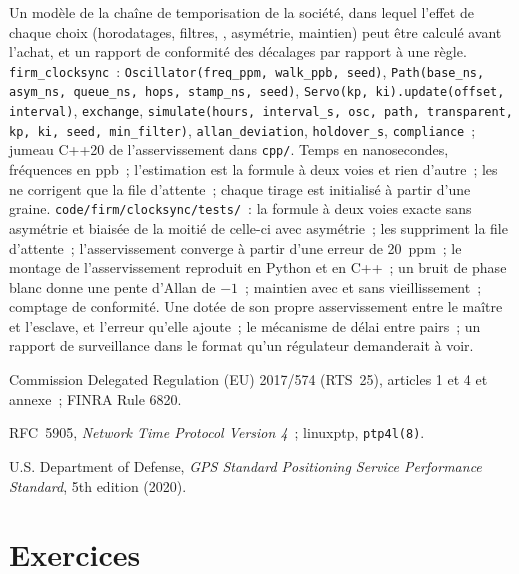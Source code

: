 \begin{build}
 Un modèle de la chaîne de temporisation de la société, dans lequel l'effet de chaque choix (horodatages, filtres, ,
  asymétrie, maintien) peut être calculé avant l'achat, et un rapport de conformité des décalages par rapport à une règle.
 \texttt{firm\_clocksync}~: \texttt{Oscillator(freq\_ppm, walk\_ppb, seed)},
\texttt{Path(base\_ns, asym\_ns, queue\_ns, hops, stamp\_ns, seed)}, \texttt{Servo(kp, ki).update(offset, interval)}, \texttt{exchange},
\texttt{simulate(hours, interval\_s, osc, path, transparent, kp, ki, seed, min\_filter)}, \texttt{allan\_deviation}, \texttt{holdover\_s}, \texttt{compliance}~;
  jumeau C++20 de l'asservissement dans \texttt{cpp/}.
 Temps en nanosecondes, fréquences en ppb~; l'estimation est la formule à deux voies et rien d'autre~; les 
  ne corrigent que la file d'attente~; chaque tirage est initialisé à partir d'une graine.
 \texttt{code/firm/clocksync/tests/}~: la formule à deux voies exacte sans asymétrie et biaisée de la moitié de celle-ci avec asymétrie~;
  les  suppriment la file d'attente~; l'asservissement converge à partir d'une erreur de 20~ppm~; le montage de l'asservissement reproduit en Python et en C++~; un bruit de phase blanc
  donne une pente d'Allan de $-1$~; maintien avec et sans vieillissement~; comptage de conformité.
 Une  dotée de son propre asservissement entre le maître et l'esclave, et l'erreur qu'elle ajoute~; le mécanisme de délai entre pairs~; un
  rapport de surveillance dans le format qu'un régulateur demanderait à voir.
\end{build}

\begin{omsources}
\item Commission Delegated Regulation (EU) 2017/574 (RTS~25), articles 1 et 4 et annexe~; FINRA Rule 6820.
\item RFC~5905, \emph{Network Time Protocol Version 4}~; linuxptp, \texttt{ptp4l(8)}.
\item U.S. Department of Defense, \emph{GPS Standard Positioning Service Performance Standard}, 5th edition (2020).
\end{omsources}

\section{Exercices}

